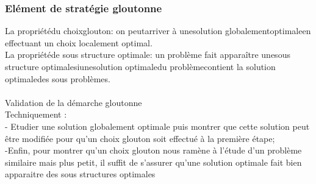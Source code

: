 \documentclass[5pt]{article}
\begin{document}
\begin{scriptsize}
\subsubsection{Elément de stratégie gloutonne}
La propriétédu choixglouton: on peutarriver à unesolution globalementoptimaleen effectuant un choix localement optimal.\\
La propriétéde sous structure optimale: un problème fait apparaître unesous structure optimalesiunesolution optimaledu problèmecontient la solution optimaledes sous problèmes.\\
\\
Validation de la démarche gloutonne \\
Techniquement  : \\
- Etudier une solution globalement optimale  puis montrer que cette solution peut être modifiée pour qu’un choix glouton soit effectué à la première étape;\\
-Enfin, pour montrer qu’un choix glouton nous ramène à l’étude d’un problème similaire mais plus petit, il suffit de s’assurer qu’une solution optimale fait bien apparaitre des sous structures optimales\\

\end{scriptsize}
\end{document}
